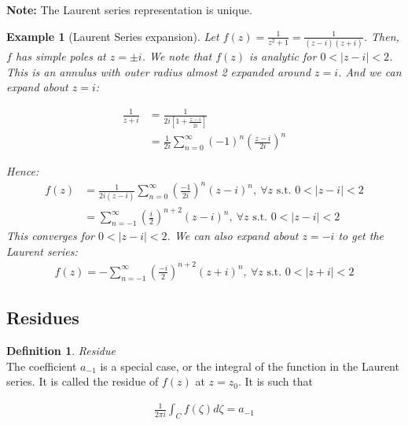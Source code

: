 \documentclass{article}
\newtheorem{ex}{Example}
\theoremstyle{definition}
\newtheorem{definition}{Definition}[section]
\newcommand{\Def}[2]{
\begin{shaded*}
\begin{definition}{\textit{#1}}\\#2\end{definition}
\end{shaded*}
}
\begin{document}
\textbf{Note:} The Laurent series representation is unique. 


\begin{ex}[Laurent Series expansion]
	Let $f(z) = \frac{1}{z^2 +1} = \frac{1}{(z-i)(z+i)}$. Then, $f$ has simple poles at $z=\pm i$. We note that $f(z)$ is analytic for $0 < |z-i| < 2$. This is an annulus with outer radius almost 2 expanded around $z=i$. And we can expand about $z=i$:
	
	\begin{align}
	\frac{1}{z+i} &= \frac{1}{2i[1 + \frac{z-i}{2i}]} \\
	&= \frac{1}{2i}\sum_{n=0}^\infty (-1)^n \left(\frac{z-i}{2i}\right)^n
	\end{align}
	
	Hence:
	\begin{align}
	f(z) &= \frac{1}{2i(z-i)} \sum_{n=0}^\infty \left(\frac{-1}{2i}\right)^n (z-i)^n,\  \forall z \text{ s.t. } 0 < |z-i| < 2 \\ 
	&= \sum_{n=-1}^\infty \left(\frac{i}{2}\right)^{n+2} (z-i)^n,\ \forall z \text{ s.t. }0 < |z-i| < 2
	\end{align}
	This converges for $0 < |z-i| < 2$. We can also expand about $z=-i$ to get the Laurent series:
	\begin{align}
	f(z) = - \sum_{n=-1}^\infty \left(\frac{-i}{2}\right)^{n+2} (z+i)^n,\ \forall z \text{ s.t. }0 < |z+i| < 2
	\end{align} 
\end{ex}


\subsection{Residues}
\Def{Residue}{The coefficient $a_{-1}$ is a special case, or the integral of the function in the Laurent series. It is called the residue of $f(z)$ at $z=z_0$. It is such that 

\begin{align}
\frac{1}{2\pi i}\int_C f(\zeta) d\zeta = a_{-1}
\end{align}

}
\end{document}
